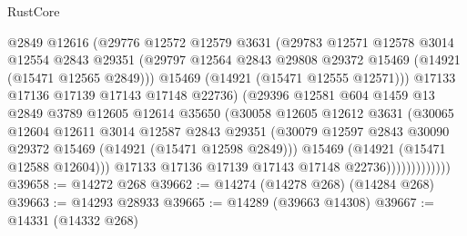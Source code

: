 \begin{lexlean}{RustCore}
\begin{coremodule}
                          @2849
                          @12616
                          (@29776
                            @12572
                            @12579
                            @3631
                            (@29783
                              @12571
                              @12578
                              @3014
                              @12554
                              @2843
                              @29351
                              (@29797
                                @12564
                                @2843
                                @29808
                                @29372
                                @15469
                                (@14921 (@15471 @12565 @2849)))
                              @15469
                              (@14921 (@15471 @12555 @12571)))
                            @17133
                            @17136
                            @17139
                            @17143
                            @17148
                            @22736)
                          (@29396
                            @12581
                            @604
                            @1459
                            @13
                            @2849
                            @3789
                            @12605
                            @12614
                            @35650
                            (@30058
                              @12605
                              @12612
                              @3631
                              (@30065
                                @12604
                                @12611
                                @3014
                                @12587
                                @2843
                                @29351
                                (@30079
                                  @12597
                                  @2843
                                  @30090
                                  @29372
                                  @15469
                                  (@14921 (@15471 @12598 @2849)))
                                @15469
                                (@14921 (@15471 @12588 @12604)))
                              @17133
                              @17136
                              @17139
                              @17143
                              @17148
                              @22736)))))))))))))
@39658 := @14272 @268
@39662 := @14274 (@14278 @268) (@14284 @268)
@39663 := @14293 @28933
@39665 := @14289 (@39663 @14308)
@39667 := @14331 (@14332 @268)

\end{coremodule}
\end{lexlean}
